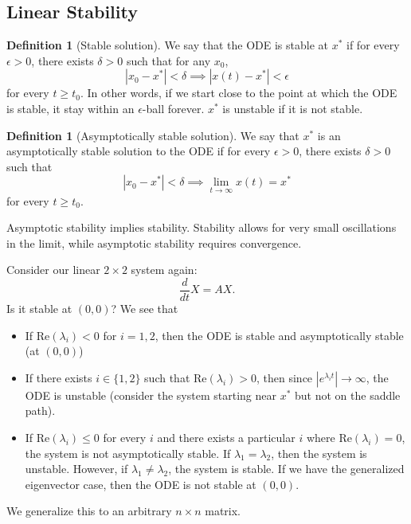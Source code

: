 \documentclass{tufte-handout}
\theoremstyle{definition}
\newtheorem{defn}[thm]{Definition}
\begin{document}
\subsection{Linear Stability}
\begin{defn}[Stable solution]
	We say that the ODE is stable at $x^*$ if for every $\epsilon > 0$, there exists $\delta > 0$ such that for any $x_0$, \[
		\left| x_0 - x^* \right| < \delta \implies \left| x(t) - x^* \right| < \epsilon
	\] for every $t \ge t_0$. In other words, if we start close to the point at which the ODE is stable, it stay within an $\epsilon$-ball forever.
	$x^*$ is unstable if it is not stable.
\end{defn}

\begin{defn}[Asymptotically stable solution]
	We say that $x^*$ is an asymptotically stable solution to the ODE if for every $\epsilon > 0$, there exists $\delta > 0$ such that \[
		\left| x_0 - x^* \right| < \delta \implies \lim\limits_{t \to \infty} x(t) = x^*
	\] for every $t \ge t_0$.
\end{defn}

Asymptotic stability implies stability. Stability allows for very small oscillations in the limit, while asymptotic stability requires convergence.

Consider our linear $2\times 2$ system again: \[
	\frac{d}{dt}X = AX
.\] Is it stable at $(0,0)$?
We see that
\begin{itemize}
	\item If $\text{Re}( \lambda_i )< 0$ for $i=1,2$, then the ODE is stable and asymptotically stable (at $(0,0)$)
	\item If there exists $i \in \{1,2\}$ such that $\text{Re} \left( \lambda_i \right) > 0$, then since $\left| e^{\lambda_i t} \right| \to \infty$, the ODE is unstable (consider the system starting near $x^*$ but not on the saddle path).
	\item If $\text{Re} (\lambda_i) \le 0$ for every $i$ and there exists a particular $i$ where $\text{Re} (\lambda_i) = 0$, the system is not asymptotically stable. If $\lambda_1 = \lambda_2$, then the system is unstable. However, if $\lambda_1 \ne \lambda_2$, the system is stable. If we have the generalized eigenvector case, then the ODE is not stable at $(0,0)$.
\end{itemize}

We generalize this to an arbitrary $n\times n$ matrix.
\end{document}

